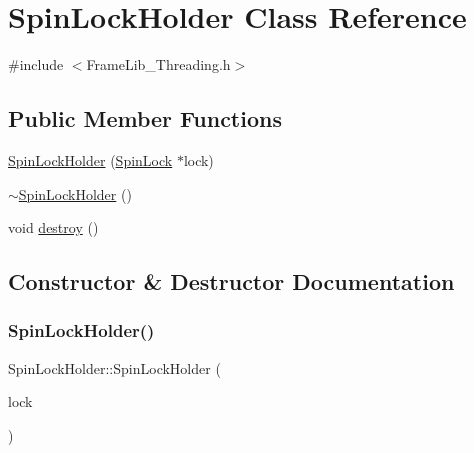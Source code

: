 \hypertarget{class_spin_lock_holder}{}\section{Spin\+Lock\+Holder Class Reference}
\label{class_spin_lock_holder}


{\ttfamily \#include $<$Frame\+Lib\+\_\+\+Threading.\+h$>$}

\subsection*{Public Member Functions}
\begin{DoxyCompactItemize}
\item 
\hyperlink{class_spin_lock_holder_a60a136bed18e62325c4ff5fa1ffc8aa5}{Spin\+Lock\+Holder} (\hyperlink{class_spin_lock}{Spin\+Lock} $\ast$lock)
\item 
\hyperlink{class_spin_lock_holder_ad5e4d4e03d210bfd2e054dd12d36be91}{$\sim$\+Spin\+Lock\+Holder} ()
\item 
void \hyperlink{class_spin_lock_holder_ac875a2a26da06fb075b5d3ea52acf104}{destroy} ()
\end{DoxyCompactItemize}


\subsection{Constructor \& Destructor Documentation}
\mbox{\label{class_spin_lock_holder_a60a136bed18e62325c4ff5fa1ffc8aa5}} 
\subsubsection{\texorpdfstring{Spin\+Lock\+Holder()}{SpinLockHolder()}}
{\footnotesize\ttfamily Spin\+Lock\+Holder\+::\+Spin\+Lock\+Holder (\begin{DoxyParamCaption}\item[{\hyperlink{class_spin_lock}{Spin\+Lock} $\ast$}]{lock }\end{DoxyParamCaption})\hspace{0.3cm}{\ttfamily [inline]}}

\mbox{\label{class_spin_lock_holder_ad5e4d4e03d210bfd2e054dd12d36be91}} 
